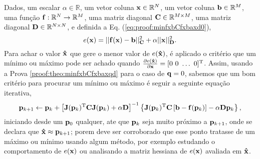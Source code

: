\begin{myproofT}\label{proof:theo:minfxbCfxbaxd}
Dados,
um escalar $\alpha\in \mathbb{R}$,
um vetor coluna $\VECTOR{x}\in \mathbb{R}^N$, 
um vetor coluna $\VECTOR{b}\in \mathbb{R}^M$,  
uma função $\VECTOR{f}:\mathbb{R}^{N} \rightarrow \mathbb{R}^{M}$, 
uma matriz diagonal $\MATRIX{C} \in \mathbb{R}^{M\times M}$,
uma matriz diagonal $\MATRIX{D} \in \mathbb{R}^{N\times N}$, e 
definida a Eq. (\ref{eq:proof:minfxbCfxbaxd0}),
\begin{equation}\label{eq:proof:minfxbCfxbaxd0}
e(\VECTOR{x})=||\VECTOR{f}(\VECTOR{x})-\VECTOR{b}||_{\MATRIX{C}}^2+\alpha||\VECTOR{x}||_{\MATRIX{D}}^2.
\end{equation}
Para achar o valor  $\VECTOR{\hat{x}}$ que gere o menor valor de $e(\VECTOR{\hat{x}})$, é aplicado
o critério que um mínimo ou máximo pode ser achado quando 
$\frac{\partial e(\VECTOR{\hat{x}})}{\partial \VECTOR{x} }=[0~ 0~ \hdots~ 0 ]^{\transpose}$.
Assim, usando a Prova \ref{proof:theo:minfxbCfxbaxqd} para o caso de $\VECTOR{q}=0$, sabemos que 
um bom critério para procurar um mínimo ou máximo é seguir a seguinte 
equação iterativa,
\begin{equation}\label{eq:proof:minfxbCfxbaxd3}
 \VECTOR{p}_{k+1} \leftarrow \VECTOR{p}_{k} +
\left[ \MATRIX{J}(\VECTOR{p}_{k})^{\transpose}\MATRIX{C} \MATRIX{J}(\VECTOR{p}_{k})+\alpha \MATRIX{D} \right]^{-1}
\left\{ \MATRIX{J}(\VECTOR{p}_{k})^{\transpose}\MATRIX{C} \left[\VECTOR{b}-\VECTOR{f}(\VECTOR{p}_{k})\right]-\alpha\MATRIX{D}\VECTOR{p}_{k}\right\},
\end{equation}
iniciando desde um $\VECTOR{p}_{0}$ qualquer, ate que $\VECTOR{p}_{k}$ seja muito próximo a $\VECTOR{p}_{k+1}$,
onde se declara que $\VECTOR{\hat{x}} \approx \VECTOR{p}_{k+1}$; porem deve ser corroborado
que esse ponto tratasse de um máximo ou mínimo usando algum método, por exemplo estudando o comportamento 
de $e(\VECTOR{x})$ ou analisando a matriz hessiana de $e(\VECTOR{x})$ avaliada em $\VECTOR{\hat{x}}$.
\end{myproofT}



